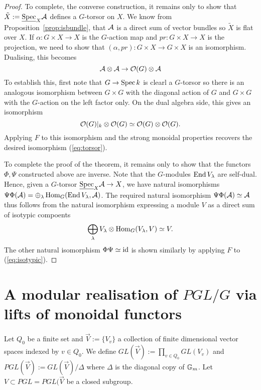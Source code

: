 \documentclass[12pt]{amsart}
\begin{document}
\begin{proof}
To complete, the converse construction, it remains only to show that $\tilde{X} :=\underline{\operatorname{Spec}}_X \mathcal{A}$ defines a $G$-torsor on $X$. We know from Proposition~\ref{prop:isbundle}, that $\mathcal{A}$ is a direct sum of vector bundles so $\tilde{X}$ is flat over $X$. If $\alpha \colon G \times X \to X$ is the $G$-action map and $pr \colon G \times X \to X$ is the projection, we need to show that $(\alpha, pr) \colon G \times X \to G \times X$ is an isomorphism. Dualising, this becomes 
\begin{equation}  \label{eq:torsor}
\mathcal{A} \otimes \mathcal{A} \to \mathcal{O}(G) \otimes \mathcal{A}
\end{equation}
To establish this, first note that $G \to \operatorname{Spec} k$ is clearl a $G$-torsor so there is an analogous isomorphism between $G \times G$ with the diagonal action of $G$ and $G \times G$ with the $G$-action on the left factor only. On the dual algebra side, this gives an isomorphism
$$ \mathcal{O}(G)|_k \otimes \mathcal{O}(G) \simeq \mathcal{O}(G) \otimes \mathcal{O}(G).
$$
Applying $F$ to this isomorphism and the strong monoidal properties recovers the desired isomorphism (\ref{eq:torsor}).

To complete the proof of the theorem, it remains only to show that the functors $\Phi, \Psi$ constructed above are inverse. Note that the $G$-modules $\operatorname{End} V_{\lambda}$ are self-dual. Hence, given a $G$-torsor $\underline{\operatorname{Spec}}_X \mathcal{A} \to X$, we have natural isomorphisms $\Psi\Phi(\mathcal{A}) = \oplus_{\lambda} \operatorname{Hom}_G(\operatorname{End} V_{\lambda}, \mathcal{A})$. The required natural isomorphism $\Psi\Phi(\mathcal{A}) \simeq \mathcal{A}$ thus follows from the natural isomorphism expressing a module $V$ as a direct sum of isotypic compoents
\begin{equation} \label{eq:isotypic} \bigoplus_{\lambda} V_{\lambda} \otimes \operatorname{Hom}_G(V_{\lambda}, V) \simeq V.
\end{equation}
The other natural isomorphism $\Phi\Psi \simeq \operatorname{id}$ is shown similarly by applying $F$ to (\ref{eq:isotypic}).
\end{proof}

\section{A modular realisation of $PGL/G$ via lifts of monoidal functors}  \label{sec:liftmonoidal}

Let $Q_0$ be a finite set and $\vec{V}:=\{V_v\}$ a  collection of finite dimensional vector spaces indexed by $v \in Q_0$. We define $GL(\vec{V}):= \prod_{v \in Q_0} GL(V_v)$ and $PGL(\vec{V}):= GL(\vec{V})/\Delta$ where $\Delta$ is the diagonal copy of $\mathbb{G}_m$. Let $V \subset PGL=PGL(\vec{V}$ be a closed subgroup. 
\end{document}

